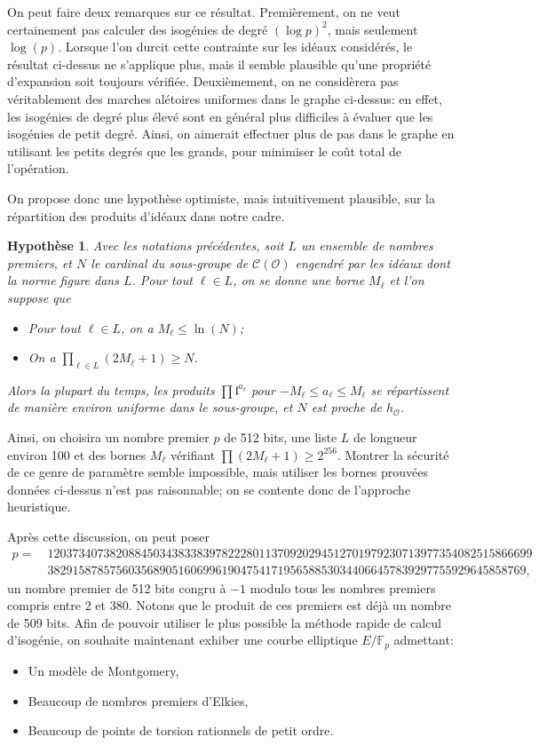\documentclass[11pt,a4paper]{article}
\newcommand{\F}{\mathbb{F}}
\renewcommand{\O}{\mathcal{O}}
\newcommand{\Cl}{\mathcal{C}}
\renewcommand{\frak}{\mathfrak}
\renewcommand{\v}{\vspace{5mm}}
\newtheorem*{hyp}{Hypothèse}
\theoremstyle{definition}
\begin{document}
On peut faire deux remarques sur ce résultat. Premièrement, on ne veut certainement pas calculer des isogénies de degré $(\log p)^2$, mais seulement $\log(p)$. Lorsque l'on durcit cette contrainte sur les idéaux considérés, le résultat ci-dessus ne s'applique plus, mais il semble plausible qu'une propriété d'expansion soit toujours vérifiée. Deuxièmement, on ne considèrera pas véritablement des marches alétoires uniformes dans le graphe ci-dessus: en effet, les isogénies de degré plus élevé sont en général plus difficiles à évaluer que les isogénies de petit degré. Ainsi, on aimerait effectuer plus de pas dans le graphe en utilisant les petits degrés que les grands, pour minimiser le coût total de l'opération.

On propose donc une hypothèse optimiste, mais intuitivement plausible, sur la répartition des produits d'idéaux dans notre cadre. 

\begin{hyp}
Avec les notations précédentes, soit $L$ un ensemble de nombres premiers, et $N$ le cardinal du sous-groupe de $\Cl(\O)$ engendré par les idéaux dont la norme figure dans $L$. Pour tout $\ell\in L$, on se donne une borne $M_\ell$ et l'on suppose que
\begin{itemize}
\item[•] Pour tout $\ell\in L$, on a $M_\ell \leq \ln(N)$;
\item[•] On a $\prod_{\ell\in L} (2M_\ell + 1) \geq N$.
\end{itemize}
Alors la plupart du temps, les produits $\prod {\frak l}^{a_\ell}$ pour $-M_\ell \leq a_\ell\leq M_\ell$ se répartissent de manière environ uniforme dans le sous-groupe, et $N$ est proche de $h_\O$.
\end{hyp}

Ainsi, on choisira un nombre premier $p$ de 512 bits, une liste $L$ de longueur environ 100 et des bornes $M_\ell$ vérifiant $\prod (2 M_\ell +1) \geq 2^{256}$. Montrer la sécurité de ce genre de paramètre semble impossible, mais utiliser les bornes prouvées données ci-dessus n'est pas raisonnable; on se contente donc de l'approche heuristique.

\v
Après cette discussion, on peut poser
$$\begin{aligned}
p =\ &120373407382088450343833839782228011370920294512701979230713977354082515866699 \\ &38291587857560356890516069961904754171956588530344066457839297755929645858769,
\end{aligned}
$$
un nombre premier de 512 bits congru à $-1$ modulo tous les nombres premiers compris entre 2 et 380. Notons que le produit de ces premiers est déjà un nombre de 509 bits. Afin de pouvoir utiliser le plus possible la méthode rapide de calcul d'isogénie, on souhaite maintenant exhiber une courbe elliptique $E/\F_p$ admettant:
\begin{itemize}
\item[•] Un modèle de Montgomery,
\item[•] Beaucoup de nombres premiers d'Elkies,
\item[•] Beaucoup de points de torsion rationnels de petit ordre.
\end{itemize}
\end{document}
